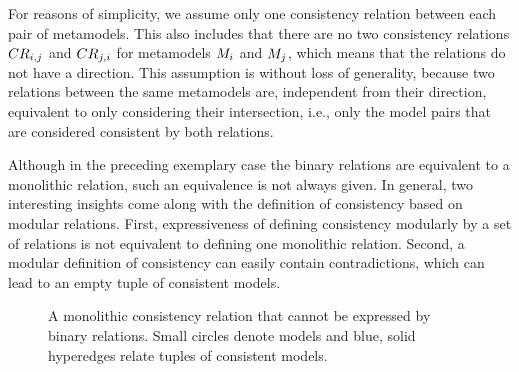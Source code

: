 For reasons of simplicity, we assume only one consistency relation between each pair of metamodels.
This also includes that there are no two consistency relations $\consistencyrelation{CR}{i,j}$ and $\consistencyrelation{CR}{j,i}$ for metamodels $\metamodel{M}{i}$ and $\metamodel{M}{j}$, which means that the relations do not have a direction.
This assumption is without loss of generality, because two relations between the same metamodels are, independent from their direction, equivalent to only considering their intersection, i.e., only the model pairs that are considered consistent by both relations.


Although in the preceding exemplary case the binary relations are equivalent to a monolithic relation, such an equivalence is not always given. In general, two interesting insights come along with the definition of consistency based on modular relations. First, expressiveness of defining consistency modularly by a set of relations is not equivalent to defining one monolithic relation. Second, a modular definition of consistency can easily contain contradictions, which can lead to an empty tuple of consistent models.

\begin{figure}
    \centering
    
    \caption[Monolithic consistency relation that cannot be modularized]{A monolithic consistency relation that cannot be expressed by binary relations. Small circles denote models and blue, solid hyperedges relate tuples of consistent models.}
    \label{fig:correctness:binary_definable}
\end{figure}

